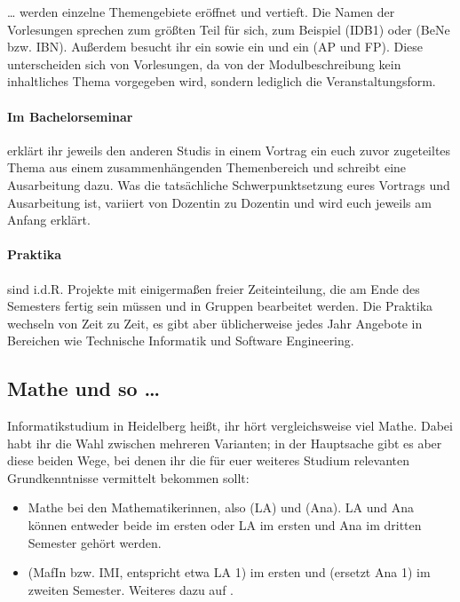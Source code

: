 \dots{} werden einzelne Themengebiete eröffnet und vertieft. Die Namen der Vorlesungen sprechen zum größten Teil für sich, zum Beispiel  (\gls{IDB1}) oder  (\gls{BeNe} bzw. IBN). Außerdem besucht ihr ein  sowie ein  und ein  (\gls{AP} und \gls{FP}). Diese unterscheiden sich von Vorlesungen, da von der Modulbeschreibung kein inhaltliches Thema vorgegeben wird, sondern lediglich die Veranstaltungsform.

\paragraph*{Im Bachelorseminar} erklärt ihr jeweils den anderen Studis in einem Vortrag ein euch zuvor zugeteiltes Thema aus einem zusammenhängenden Themenbereich und schreibt eine Ausarbeitung dazu. Was die tatsächliche Schwerpunktsetzung eures Vortrags und Ausarbeitung ist, variiert von Dozentin zu Dozentin und wird euch jeweils am Anfang erklärt.

\paragraph*{Praktika} sind i.d.R. Projekte mit einigermaßen freier Zeiteinteilung, die am Ende des Semesters fertig sein müssen und in Gruppen bearbeitet werden. Die Praktika wechseln von Zeit zu Zeit, es gibt aber üblicherweise jedes Jahr Angebote in Bereichen wie Technische Informatik und Software Engineering.

\subsection{Mathe und so \dots}

Informatikstudium in Heidelberg heißt, ihr hört vergleichsweise viel Mathe. Dabei habt ihr die Wahl zwischen mehreren Varianten; in der Hauptsache gibt es aber diese beiden Wege, bei denen ihr die für euer weiteres Studium relevanten Grundkenntnisse vermittelt bekommen sollt:

\begin{itemize}
    \item Mathe bei den Mathematikerinnen, also  (\gls{LA}) und  (\gls{Ana}). \gls{LA} und \gls{Ana} können entweder beide im ersten oder \gls{LA} im ersten und \gls{Ana} im dritten Semester gehört werden.
    \item {} (\gls{MafIn} bzw. IMI, entspricht etwa \gls{LA} 1) im ersten und  (ersetzt \gls{Ana} 1) im zweiten Semester. Weiteres dazu auf .
\end{itemize}

